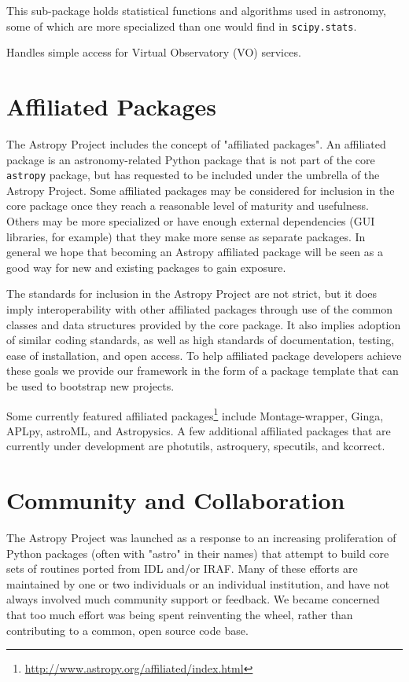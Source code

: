 \documentclass[11pt,twoside]{article}
\begin{document}
This sub-package holds statistical functions and algorithms used in astronomy,
some of which are more specialized than one would find in
\texttt{scipy.stats}.


Handles simple access for Virtual Observatory (VO) services.

\section{Affiliated Packages}

The Astropy Project includes the concept of "affiliated packages".  An
affiliated package is an astronomy-related Python package that is not part of
the core \texttt{astropy} package, but has requested to be included under the
umbrella of the Astropy Project.  Some affiliated packages may be considered
for inclusion in the core package once they reach a reasonable level of
maturity and usefulness.  Others may be more specialized or have enough
external dependencies (GUI libraries, for example) that they make more sense as
separate packages.  In general we hope that becoming an Astropy affiliated
package will be seen as a good way for new and existing packages to gain
exposure.

The standards for inclusion in the Astropy Project are not strict, but it does
imply interoperability with other affiliated packages through use of the common
classes and data structures provided by the core package.  It also implies
adoption of similar coding standards, as well as high standards of
documentation, testing, ease of installation, and open access.  To help
affiliated package developers achieve these goals we provide our framework in
the form of a package template that can be used to bootstrap new projects.

Some currently featured affiliated
packages\footnote{\url{http://www.astropy.org/affiliated/index.html}} include
Montage-wrapper, Ginga, APLpy, astroML, and Astropysics.  A few additional
affiliated packages that are currently under development are photutils,
astroquery, specutils, and kcorrect.

\section{Community and Collaboration}

The Astropy Project was launched as a response to an increasing proliferation
of Python packages (often with "astro" in their names) that attempt to build
core sets of routines ported from IDL and/or IRAF.  Many of these efforts are
maintained by one or two individuals or an individual institution, and have not
always involved much community support or feedback.  We became concerned that
too much effort was being spent reinventing the wheel, rather than contributing
to a common, open source code base.
\end{document}
